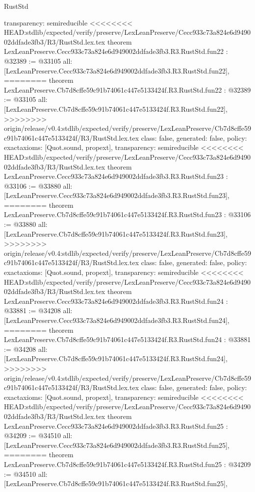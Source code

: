 \begin{lexlean}{RustStd}
\begin{coremodule}
{\begin{coremodule}
{{{{{{{{{{{{{{{{{{{{{{{{{  transparency: semireducible
}
<<<<<<<< HEAD:stdlib/expected/verify/preserve/LexLeanPreserve/Cecc933c73a824e6d949002ddfade3fb3/R3/RustStd.lex.tex
theorem LexLeanPreserve.Cecc933c73a824e6d949002ddfade3fb3.R3.RustStd.fun22 : @32389 := @33105 {
  all: [LexLeanPreserve.Cecc933c73a824e6d949002ddfade3fb3.R3.RustStd.fun22],
========
theorem LexLeanPreserve.Cb7d8cffe59c91b74061c447e5133424f.R3.RustStd.fun22 : @32389 := @33105 {
  all: [LexLeanPreserve.Cb7d8cffe59c91b74061c447e5133424f.R3.RustStd.fun22],
>>>>>>>> origin/release/v0.4:stdlib/expected/verify/preserve/LexLeanPreserve/Cb7d8cffe59c91b74061c447e5133424f/R3/RustStd.lex.tex
  class: false,
  generated: false,
  policy: exact{axioms: [Quot.sound, propext]},
  transparency: semireducible
}
<<<<<<<< HEAD:stdlib/expected/verify/preserve/LexLeanPreserve/Cecc933c73a824e6d949002ddfade3fb3/R3/RustStd.lex.tex
theorem LexLeanPreserve.Cecc933c73a824e6d949002ddfade3fb3.R3.RustStd.fun23 : @33106 := @33880 {
  all: [LexLeanPreserve.Cecc933c73a824e6d949002ddfade3fb3.R3.RustStd.fun23],
========
theorem LexLeanPreserve.Cb7d8cffe59c91b74061c447e5133424f.R3.RustStd.fun23 : @33106 := @33880 {
  all: [LexLeanPreserve.Cb7d8cffe59c91b74061c447e5133424f.R3.RustStd.fun23],
>>>>>>>> origin/release/v0.4:stdlib/expected/verify/preserve/LexLeanPreserve/Cb7d8cffe59c91b74061c447e5133424f/R3/RustStd.lex.tex
  class: false,
  generated: false,
  policy: exact{axioms: [Quot.sound, propext]},
  transparency: semireducible
}
<<<<<<<< HEAD:stdlib/expected/verify/preserve/LexLeanPreserve/Cecc933c73a824e6d949002ddfade3fb3/R3/RustStd.lex.tex
theorem LexLeanPreserve.Cecc933c73a824e6d949002ddfade3fb3.R3.RustStd.fun24 : @33881 := @34208 {
  all: [LexLeanPreserve.Cecc933c73a824e6d949002ddfade3fb3.R3.RustStd.fun24],
========
theorem LexLeanPreserve.Cb7d8cffe59c91b74061c447e5133424f.R3.RustStd.fun24 : @33881 := @34208 {
  all: [LexLeanPreserve.Cb7d8cffe59c91b74061c447e5133424f.R3.RustStd.fun24],
>>>>>>>> origin/release/v0.4:stdlib/expected/verify/preserve/LexLeanPreserve/Cb7d8cffe59c91b74061c447e5133424f/R3/RustStd.lex.tex
  class: false,
  generated: false,
  policy: exact{axioms: [Quot.sound, propext]},
  transparency: semireducible
}
<<<<<<<< HEAD:stdlib/expected/verify/preserve/LexLeanPreserve/Cecc933c73a824e6d949002ddfade3fb3/R3/RustStd.lex.tex
theorem LexLeanPreserve.Cecc933c73a824e6d949002ddfade3fb3.R3.RustStd.fun25 : @34209 := @34510 {
  all: [LexLeanPreserve.Cecc933c73a824e6d949002ddfade3fb3.R3.RustStd.fun25],
========
theorem LexLeanPreserve.Cb7d8cffe59c91b74061c447e5133424f.R3.RustStd.fun25 : @34209 := @34510 {
  all: [LexLeanPreserve.Cb7d8cffe59c91b74061c447e5133424f.R3.RustStd.fun25],
}}}}}}}}}}}}}}}}}}}}}}}}}}}}}
\end{coremodule}}
\end{coremodule}
\end{lexlean}
